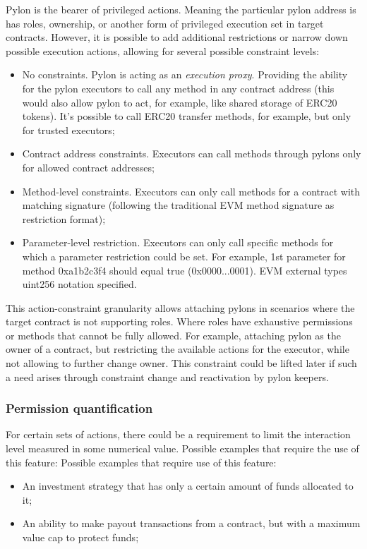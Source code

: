 \documentclass[12pt]{article}
\begin{document}
Pylon is the bearer of privileged actions. Meaning the particular pylon address is has roles, ownership, or another form of privileged execution set in target contracts. However, it is possible to add additional restrictions or narrow down possible execution actions, allowing for several possible constraint levels:
\begin{itemize}

\item{No constraints. Pylon is acting as an \emph{execution proxy}. Providing the ability for the pylon executors to call any method in any contract address (this would also allow pylon to act, for example, like shared storage of ERC20 tokens). It’s possible to call ERC20 transfer methods, for example, but only for trusted executors;}
\item{Contract address constraints. Executors can call methods through pylons only for allowed contract addresses;}
\item{Method-level constraints. Executors can only call methods for a contract with matching signature (following the traditional EVM method signature as restriction format);}
\item{Parameter-level restriction. Executors can only call specific methods for which a parameter restriction could be set. For example, 1st parameter for method 0xa1b2c3f4 should equal true (0x0000...0001). EVM external types uint256 notation specified.}
\end{itemize}

This action-constraint granularity allows attaching pylons in scenarios where the target contract is not supporting roles. Where roles have exhaustive permissions or methods that cannot be fully allowed. For example, attaching pylon as the owner of a contract, but restricting the available actions for the executor, while not allowing to further change owner. This constraint could be lifted later if such a need arises through constraint change and reactivation by pylon keepers.


\subsubsection{Permission quantification}
\label{permission_quantification}

For certain sets of actions, there could be a requirement to limit the interaction level measured in some numerical value. Possible examples that require the use of this feature:
Possible examples that require use of this feature:
\begin{itemize}
\item{An investment strategy that has only a certain amount of funds allocated to it;}
\item{An ability to make payout transactions from a contract, but with a maximum value cap to protect funds;}
\end{itemize}
\end{document}
